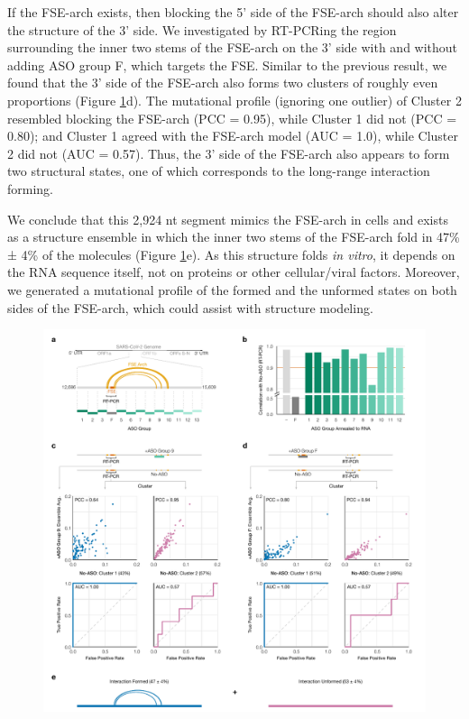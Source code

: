 \documentclass[main.tex]{subfiles}
\begin{document}
If the FSE-arch exists, then blocking the 5' side of the FSE-arch should also alter the structure of the 3' side.
We investigated by RT-PCRing the region surrounding the inner two stems of the FSE-arch on the 3' side with and without adding ASO group F, which targets the FSE.
Similar to the previous result, we found that the 3' side of the FSE-arch also forms two clusters of roughly even proportions (Figure \ref{tiles}d).
The mutational profile (ignoring one outlier) of Cluster 2 resembled blocking the FSE-arch (PCC = 0.95), while Cluster 1 did not (PCC = 0.80); and Cluster 1 agreed with the FSE-arch model (AUC = 1.0), while Cluster 2 did not (AUC = 0.57).
Thus, the 3' side of the FSE-arch also appears to form two structural states, one of which corresponds to the long-range interaction forming.

We conclude that this 2,924 nt segment mimics the FSE-arch in cells and exists as a structure ensemble in which the inner two stems of the FSE-arch fold in 47\% ± 4\% of the molecules (Figure \ref{tiles}e).
As this structure folds \textit{in vitro}, it depends on the RNA sequence itself, not on proteins or other cellular/viral factors.
Moreover, we generated a mutational profile of the formed and the unformed states on both sides of the FSE-arch, which could assist with structure modeling.

\begin{figure}[ht]
	\includegraphics[width=\textwidth]{../MainFigures/sars2-tile/sars2-tile.pdf}
	\caption{}
	\label{tiles}
\end{figure}
\end{document}
